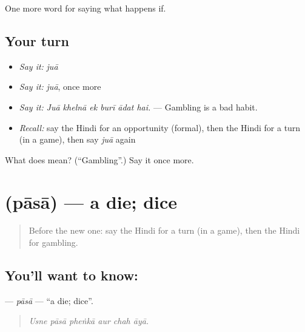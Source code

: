 \begin{grammarlens}[title={What you've built}]
One more word for saying what happens if.
\end{grammarlens}

\subsection*{Your turn}
\begin{itemize}
\raggedright
  \item \emph{Say it:} \emph{juā}
  \item \emph{Say it:} \emph{juā}, once more
  \item \emph{Say it:} \emph{Juā khelnā ek burī ādat hai.} — Gambling is a bad habit.
  \item \emph{Recall:} say the Hindi for an opportunity (formal), then the Hindi for a turn (in a game), then say \emph{juā} again
\end{itemize}

\begin{tcolorbox}[breakable,colback=teal!4,colframe=teal!35!black,title={Before you move on}]
What does  mean? (\textquotedblleft{}Gambling\textquotedblright{}.) Say it once more.
\end{tcolorbox}
\section[\texorpdfstring{\hi{पासा} (pāsā)}{पासा (pāsā)}]{ (pāsā) — a die; dice}

\label{lesson:HI-C545-pasa}



\begin{quote}
Before the new one: say the Hindi for a turn (in a game), then the Hindi for gambling.
\end{quote}

\subsection*{You'll want to know: }
\textbf{} — \emph{pāsā} — \textquotedblleft{}a die; dice\textquotedblright{}.

\begin{quote}
     
\end{quote}

\begin{quote}
\emph{Usne pāsā pheṅkā aur chah āyā.}
\end{quote}

